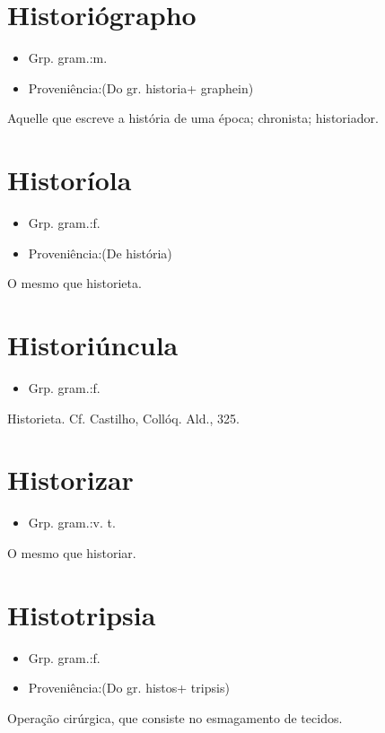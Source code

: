 \documentclass{article}
\begin{document}
\section{Historiógrapho}
\begin{itemize}
\item {Grp. gram.:m.}
\end{itemize}
\begin{itemize}
\item {Proveniência:(Do gr. \textunderscore historia\textunderscore  + \textunderscore graphein\textunderscore )}
\end{itemize}
Aquelle que escreve a história de uma época; chronista; historiador.
\section{Historíola}
\begin{itemize}
\item {Grp. gram.:f.}
\end{itemize}
\begin{itemize}
\item {Proveniência:(De \textunderscore história\textunderscore )}
\end{itemize}
O mesmo que \textunderscore historieta\textunderscore .
\section{Historiúncula}
\begin{itemize}
\item {Grp. gram.:f.}
\end{itemize}
Historieta. Cf. Castilho, \textunderscore Collóq. Ald.\textunderscore , 325.
\section{Historizar}
\begin{itemize}
\item {Grp. gram.:v. t.}
\end{itemize}
O mesmo que \textunderscore historiar\textunderscore .
\section{Histotripsia}
\begin{itemize}
\item {Grp. gram.:f.}
\end{itemize}
\begin{itemize}
\item {Proveniência:(Do gr. \textunderscore histos\textunderscore  + \textunderscore tripsis\textunderscore )}
\end{itemize}
Operação cirúrgica, que consiste no esmagamento de tecidos.
\end{document}
